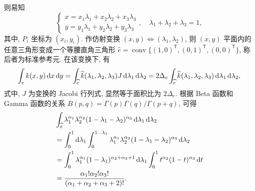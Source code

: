 则易知
\begin{equation*}
\begin{cases}
x = x_1\lambda_1 + x_2\lambda_2 + x_3\lambda_3 \\
y = y_1\lambda_1 + y_2\lambda_2 + y_3\lambda_3
\end{cases}, \quad \lambda_1 + \lambda_2 + \lambda_3 = 1,
\end{equation*}
其中, $P_i$ 坐标为 $(x_i, y_i)$. 作仿射变换 $(x,y) \Leftrightarrow (\lambda_1, \lambda_2)$, 则
$(x,y)$ 平面内的任意三角形变成一个等腰直角三角形 $\widehat{e} =
\operatorname{conv}\{(1,0)^{\mathsf{T}}, (0,1)^{\mathsf{T}}, (0,0)^{\mathsf{T}}\}$,
称后者为标准参考元. 在该变换下, 有
\begin{equation*}
\int_e k(x,y)\mathop{}\!\mathrm{d} x\mathop{}\!\mathrm{d} y = \int_{\widehat{e}} \widehat{k}(\lambda_1,\lambda_2,\lambda_3)
J\mathop{}\!\mathrm{d}\lambda_1\mathop{}\!\mathrm{d}\lambda_2 = 2\Delta_e \int_{\widehat{e}}
\widehat{k}(\lambda_1,\lambda_2,\lambda_3)\mathop{}\!\mathrm{d}\lambda_1\mathop{}\!\mathrm{d}\lambda_2,
\end{equation*}
式中, $J$ 为变换的 Jacobi 行列式, 显然等于面积比为 $2\Delta_e$. 根据 Beta 函数和 Gamma 函数的关系
 $B(p,q) = \Gamma(p)\Gamma(q)/\Gamma(p+q)$, 可得
\begin{align*}
&\int_{\widehat{e}} \lambda_1^{\alpha_1} \lambda_2^{\alpha_2}
(1-\lambda_1-\lambda_2)^{\alpha_3}\mathop{}\!\mathrm{d}\lambda_1\mathop{}\!\mathrm{d}\lambda_2 \\
&= \int_0^1 \mathop{}\!\mathrm{d}\lambda_1 \int_0^{1-\lambda_1} \lambda_1^{\alpha_1} \lambda_2^{\alpha_2}
(1-\lambda_1-\lambda_2)^{\alpha_3}\mathop{}\!\mathrm{d}\lambda_2 \\
&= \int_0^1 \lambda_1^{\alpha_1} (1-\lambda_1)^{\alpha_2+\alpha_3+1}\mathop{}\!\mathrm{d}\lambda_1 \int_0^1
t^{\alpha_2} (1-t)^{\alpha_3}\mathop{}\!\mathrm{d} t \\
&= \frac{\alpha_1! \alpha_2! \alpha_3!}{(\alpha_1+\alpha_2+\alpha_3+2)!}.
\end{align*}